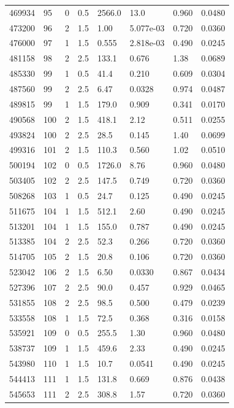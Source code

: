 \documentclass[preview]{standalone}
\begin{document}
{{{{{\begin{tabular}{L{1.2cm}C{1.2cm} C{0.3cm}C{0.5cm} C{1.4cm}C{1.4cm} C{1.4cm}C{1.4cm}}
  469934  &    95  & 0     & 0.5 &  2566.0  & 13.0  & 0.960 &  0.0480   \\ 
  473200  &    96  & 2     & 1.5 &  1.00  & 5.077e-03  & 0.720 &  0.0360   \\ 
  476000  &    97  & 1     & 1.5 &  0.555  & 2.818e-03  & 0.490 &  0.0245   \\ 
  481158  &    98  & 2     & 2.5 &  133.1  & 0.676  & 1.38 &  0.0689   \\ 
  485330  &    99  & 1     & 0.5 &  41.4  & 0.210  & 0.609 &  0.0304   \\ 
  487560  &    99  & 2     & 2.5 &  6.47  & 0.0328  & 0.974 &  0.0487   \\ 
  489815  &    99  & 1     & 1.5 &  179.0  & 0.909  & 0.341 &  0.0170   \\ 
  490568  &   100  & 2     & 1.5 &  418.1  & 2.12  & 0.511 &  0.0255   \\ 
  493824  &   100  & 2     & 2.5 &  28.5  & 0.145  & 1.40 &  0.0699   \\ 
  499316  &   101  & 2     & 1.5 &  110.3  & 0.560  & 1.02 &  0.0510   \\ 
  500194  &   102  & 0     & 0.5 &  1726.0  & 8.76  & 0.960 &  0.0480   \\ 
  503405  &   102  & 2     & 2.5 &  147.5  & 0.749  & 0.720 &  0.0360   \\ 
  508268  &   103  & 1     & 0.5 &  24.7  & 0.125  & 0.490 &  0.0245   \\ 
  511675  &   104  & 1     & 1.5 &  512.1  & 2.60  & 0.490 &  0.0245   \\ 
  513201  &   104  & 1     & 1.5 &  155.0  & 0.787  & 0.490 &  0.0245   \\ 
  513385  &   104  & 2     & 2.5 &  52.3  & 0.266  & 0.720 &  0.0360   \\ 
  514705  &   105  & 2     & 1.5 &  20.8  & 0.106  & 0.720 &  0.0360   \\ 
  523042  &   106  & 2     & 1.5 &  6.50  & 0.0330  & 0.867 &  0.0434   \\ 
  527396  &   107  & 2     & 2.5 &  90.0  & 0.457  & 0.929 &  0.0465   \\ 
  531855  &   108  & 2     & 2.5 &  98.5  & 0.500  & 0.479 &  0.0239   \\ 
  533558  &   108  & 1     & 1.5 &  72.5  & 0.368  & 0.316 &  0.0158   \\ 
  535921  &   109  & 0     & 0.5 &  255.5  & 1.30  & 0.960 &  0.0480   \\ 
  538737  &   109  & 1     & 1.5 &  459.6  & 2.33  & 0.490 &  0.0245   \\ 
  543980  &   110  & 1     & 1.5 &  10.7  & 0.0541  & 0.490 &  0.0245   \\ 
  544413  &   111  & 1     & 1.5 &  131.8  & 0.669  & 0.876 &  0.0438   \\ 
  545653  &   111  & 2     & 2.5 &  308.8  & 1.57  & 0.720 &  0.0360   \\ 
\hline 
\end{tabular} 

}}}}}
\end{document}
